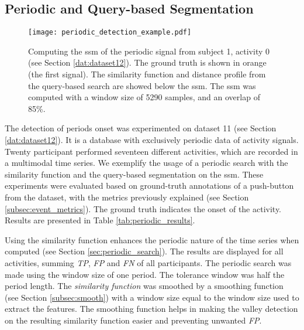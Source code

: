 \subsection{Periodic and Query-based Segmentation}

\begin{wrapfigure}{l}{0.5\linewidth}
\centering
\texttt{[image: periodic\_detection\_example.pdf]}
\caption{Computing the \gls{ssm} of the periodic signal from subject 1, activity 0 (see Section \ref{dat:dataset12}). The ground truth is shown in orange (the first signal). The similarity function and distance profile from the query-based search are showed below the \gls{ssm}. The \gls{ssm} was computed with a window size of 5290 samples, and an overlap of 85\%.}
\label{fig:periodic_detection}
\end{wrapfigure}

The detection of periods onset was experimented on dataset 11 (see Section \ref{dat:dataset12}). It is a database with exclusively periodic data of activity signals. Twenty participant performed seventeen different activities, which are recorded in a multimodal time series. We exemplify the usage of a periodic search with the similarity function and the query-based segmentation on the \gls{ssm}. These experiments were evaluated based on ground-truth annotations of a push-button from the dataset, with the metrics previously explained (see Section \ref{subsec:event_metrics}). The ground truth indicates the onset of the activity. Results are presented in Table \ref{tab:periodic_results}.

Using the similarity function enhances the periodic nature of the time series when computed (see Section \ref{sec:periodic_search}). The results are displayed for all activities, summing \textit{TP}, \textit{FP} and \textit{FN} of all participants. The periodic search was made using the window size of one period. The tolerance window was half the period length. The \textit{similarity function} was smoothed by a smoothing function (see Section \ref{subsec:smooth}) with a window size equal to the window size used to extract the features. The smoothing function helps in making the valley detection on the resulting similarity function easier and preventing unwanted \textit{FP}.

